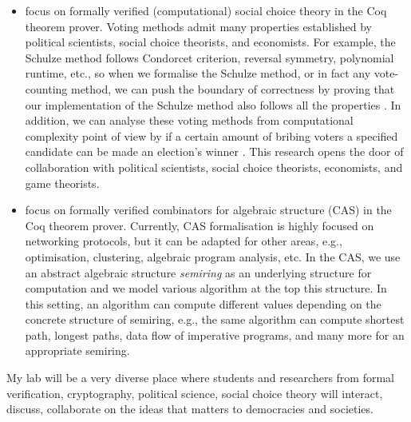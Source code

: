 \documentclass[a4paper]{article}
\begin{document}
\begin{itemize}
\item focus on formally verified (computational) social choice theory in the Coq theorem prover. 
	Voting methods admit many properties established by political scientists, social choice theorists, 
	and economists. For example, the Schulze method follows Condorcet criterion, reversal symmetry,
	polynomial runtime, etc., so when we formalise the Schulze method, or in fact any vote-counting method, 
	we can push the boundary of correctness by proving that our 
	implementation of the Schulze method also follows all the properties \cite{tiwari2021machine}. 
	In addition, we can analyse these voting
	methods from computational complexity point of view by if a certain amount of bribing
	voters a specified candidate can be made an election's winner \cite{faliszewski2006complexity}. 
	This research opens the door of collaboration with political scientists, 
	social choice theorists, economists, and game theorists.

\item focus on formally verified combinators for algebraic structure (CAS) in the Coq theorem prover. 
	Currently, CAS formalisation is highly focused on networking protocols, but it can be 
	adapted for other areas, e.g., optimisation, clustering, algebraic program 
	analysis, etc. In the CAS, we use an abstract algebraic structure 
	\emph{semiring} as an underlying structure
	for computation and we model various algorithm at the top this 
	structure. In this setting, an algorithm can compute different values depending 
	on the concrete structure of semiring, e.g., the same algorithm 
	can compute shortest path, longest paths, 
	data flow of imperative programs, and many more \cite{gondran2008graphs} 
	for an appropriate semiring.
	

\end{itemize}

My lab will be a very diverse place where students and researchers from formal 
verification, cryptography, 
political science, social choice theory will interact, discuss, 
collaborate on the ideas that matters to democracies and societies.


 

\end{document}
